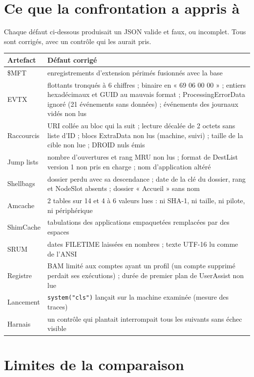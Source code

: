 \documentclass[11pt,a4paper,oneside]{report}
\begin{document}
\chapter{Ce que la confrontation a appris à \wac{}}\label{chap:defauts}

Chaque défaut ci-dessous produisait un JSON valide et faux, ou incomplet. Tous
sont corrigés, avec un contrôle qui les aurait pris.

\begin{longtable}{@{}L{3.0cm}L{12.0cm}@{}}
\toprule
\textbf{Artefact} & \textbf{Défaut corrigé} \\
\midrule\endhead
\$MFT & enregistrements d'extension périmés fusionnés avec la base \\
EVTX & flottants tronqués à 6 chiffres ; binaire en « 69 06 00 00 » ; entiers hexadécimaux et GUID au mauvais format ; ProcessingErrorData ignoré (21 événements sans données) ; événements des journaux vidés non lus \\
Raccourcis & URI collée au bloc qui la suit ; lecture décalée de 2 octets sans liste d'ID ; blocs ExtraData non lus (machine, suivi) ; taille de la cible non lue ; DROID nuls émis \\
Jump lists & nombre d'ouvertures et rang MRU non lus ; format de DestList version 1 non pris en charge ; nom d'application altéré \\
Shellbags & dossier perdu avec sa descendance ; date de la clé du dossier, rang et NodeSlot absents ; dossier « Accueil » sans nom \\
Amcache & 2 tables sur 14 et 4 à 6 valeurs lues : ni SHA-1, ni taille, ni pilote, ni périphérique \\
ShimCache & tabulations des applications empaquetées remplacées par des espaces \\
SRUM & dates FILETIME laissées en nombres ; texte UTF-16 lu comme de l'ANSI \\
Registre & BAM limité aux comptes ayant un profil (un compte supprimé perdait ses exécutions) ; durée de premier plan de UserAssist non lue \\
Lancement & \texttt{system("cls")} lançait  sur la machine examinée (mesure des traces) \\
Harnais & un contrôle qui plantait interrompait tous les suivants sans échec visible \\
\bottomrule
\end{longtable}

\chapter{Limites de la comparaison}
\end{document}

